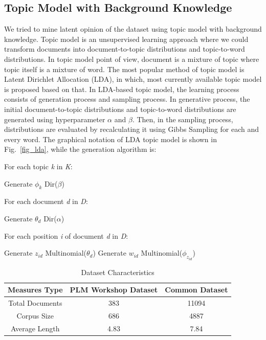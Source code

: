 \documentclass[conference]{IEEEtran}
\begin{document}
\subsection{Topic Model with Background Knowledge}
We tried to mine latent opinion of the dataset  using topic  model with background knowledge. Topic model is an unsupervised learning approach where we could transform documents into document-to-topic distributions and topic-to-word distributions. In topic model point of view, document is a mixture of topic where topic itself is a mixture of word. The most popular method of topic model is Latent Dirichlet Allocation (LDA)\cite{b8}, in which, most currently available topic model is proposed based on that. In LDA-based topic model, the learning process consists of generation process and sampling process. In generative process, the initial document-to-topic distributions and topic-to-word distributions are generated using hyperparameter $\alpha$ and $\beta$. Then, in the sampling process, distributions are evaluated by recalculating it using Gibbs Sampling for each and every word. The graphical notation of LDA topic model is shown in Fig.~\ref{fig_lda}, while the generation algorithm is:
\bigskip

\begin{algorithmic}[1]
\STATE For each topic {\it k} in {\it K}:
\begin{ALC@g} 
\STATE Generate $\phi_k$ \texttildelow{} Dir($\beta$) 
\end{ALC@g}
\STATE For each document {\it d} in {\it D}:
\begin{ALC@g} 
\STATE Generate $\theta_d$ \texttildelow{} Dir($\alpha$) 
\end{ALC@g}
\STATE For each position {\it i} of document {\it d} in {\it D}:
\begin{ALC@g} 
\STATE Generate $z_{id}$ \texttildelow{} Multinomial($\theta_d$)
\STATE Generate $w_{id}$ \texttildelow{} Multinomial($\phi_{z_{id}}$)
\end{ALC@g}
\end{algorithmic}
\bigskip

\begin{table}[h]
\caption{Dataset Characteristics}
\begin{tabular}{|c|c|c|}
\hline
\textbf{Measures Type}&\textbf{PLM Workshop Dataset}&\textbf{Common Dataset \cite{b6}}\\
\hline
Total Documents&383&11094  \\
\hline
Corpus Size&686&4887 \\
\hline
Average Length&4.83&7.84 \\
\hline
\end{tabular}
\label{table 1: dataset characteristics}
\end{table}
\end{document}
